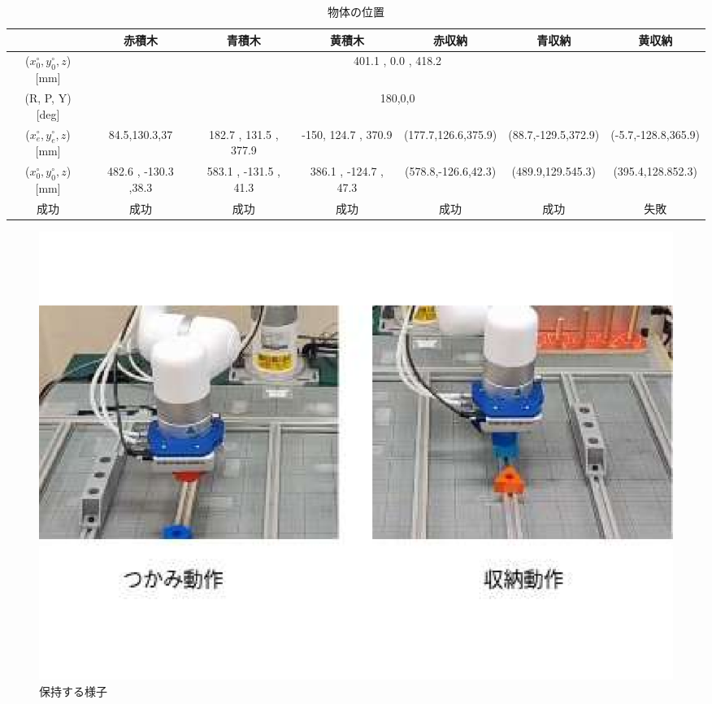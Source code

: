 \begin{table}[h]
  \centering
  \scriptsize %
  \caption{物体の位置}
  \begin{tabular}{|c|c|c|c|c|c|c|}
    \hline
                                             & 赤積木                                     & 青積木                & 黄積木                & 赤収納              & 青収納              & 黄収納              \\ \hline
    \hline
    ($x_{0}^{\circ}, y_{0}^{\circ}, z$) [mm] & \multicolumn{6}{|c|}{401.1 , 0.0 , 418.2 }                                                                                                                   \\ \hline
    (R, P, Y) [deg]                          & \multicolumn{6}{|c|}{180,0,0             }                                                                                                                   \\ \hline
    ($x_{e}^{\circ}, y_{e}^{\circ}, z$) [mm] & 84.5,130.3,37                              & 182.7 , 131.5 , 377.9 & -150, 124.7 , 370.9   & (177.7,126.6,375.9) & (88.7,-129.5,372.9) & (-5.7,-128.8,365.9) \\ \hline
    ($x_{0}^{\circ}, y_{0}^{\circ}, z$) [mm] & 482.6 , -130.3 ,38.3                       & 583.1 , -131.5 , 41.3 & 386.1 , -124.7 , 47.3 & (578.8,-126.6,42.3) & (489.9,129.545.3)   & (395.4,128.852.3)   \\ \hline
    成功                                     & 成功                                       & 成功                  & 成功                  & 成功                & 成功                & 失敗                \\ \hline 
    
  \end{tabular}
\end{table}

\begin{figure}[H]
  \centering
  \includegraphics[scale=0.5]{sozai/8.pdf}
  \caption{保持する様子}
\end{figure}

